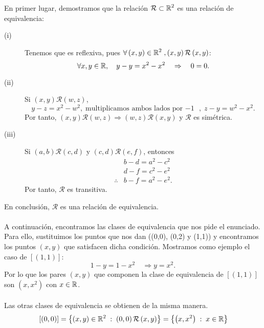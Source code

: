 \documentclass{article}
\begin{document}
\begin{sol}
	En primer lugar, demostramos que la relación $\displaystyle \mathcal{R} \subset \mathbb{R}^{2} $ es una relación de equivalencia:
	\begin{description}
		\item[(i)] Tenemos que es reflexiva, pues $\displaystyle \forall\left(x,y\right)\in\mathbb{R}^{2}\; , \left(x,y\right)\mathcal{R}\left(x,y\right) $:
			\[\forall x,y \in \mathbb{R}, \quad y - y = x^{2} - x^{2} \quad \Rightarrow \quad 0=0  .\]
		\item[(ii)] Si $\displaystyle \left(x,y\right)\mathcal{R}\left(w,z\right) $, 
			\[y - z = x^{2}-w^{2}, \; \text{multiplicamos ambos lados por $\displaystyle -1 $ }, \; z-y = w^{2} - x^{2} .\]
			Por tanto, $\displaystyle \left(x,y\right)\mathcal{R}\left(w,z\right) \Rightarrow \left(w,z\right)\mathcal{R}\left(x,y\right) $ y $\displaystyle \mathcal{R} $ es simétrica. 
		\item[(iii)] Si $\displaystyle \left(a,b\right)\mathcal{R}\left(c,d\right) $ y $\displaystyle \left(c,d\right)\mathcal{R}\left(e,f\right) $, entonces
			\[
			\begin{split}
			& b-d = a^{2}-c^{2} \\
			& d-f = c^{2}-e^{2} \\
			\therefore & b - f = a^{2}-e^{2} .
			\end{split}
			\]
			Por tanto, $\displaystyle \mathcal{R} $ es transitiva. 
	\end{description}
	En conclusión, $\displaystyle \mathcal{R} $ es una relación de equivalencia. \\ \\
	A continuación, encontramos las clases de equivalencia que nos pide el enunciado. Para ello, sustituimos los puntos que nos dan ((0,0), (0,2) y (1,1)) y encontramos los puntos $\displaystyle \left(x,y\right) $ que satisfacen dicha condición. Mostramos como ejemplo el caso de $\displaystyle \left[\left(1,1\right)\right]  $:
	\[1-y = 1- x^{2} \quad \Rightarrow y = x^{2} .\]
	Por lo que los pares $\displaystyle \left(x,y\right) $ que componen la clase de equivalencia de $\displaystyle \left[\left(1,1\right)\right]  $ son $\displaystyle \left(x,x^{2}\right) $ con $\displaystyle x\in\mathbb{R} $. \\ \\
	Las otras clases de equivalencia se obtienen de la misma manera.
	\[
	\begin{split}
	& \left[\left(0,0\right)\right] = \left \{ \left(x,y\right)\in \R^{2}\; : \; \left(0,0\right)\mathcal{R}\left(x,y\right)\right \} = \left \{ \left(x, x^{2}\right)\; : \; x\in \R\right \} \\

\end{split}\]
\end{sol}
\end{document}
